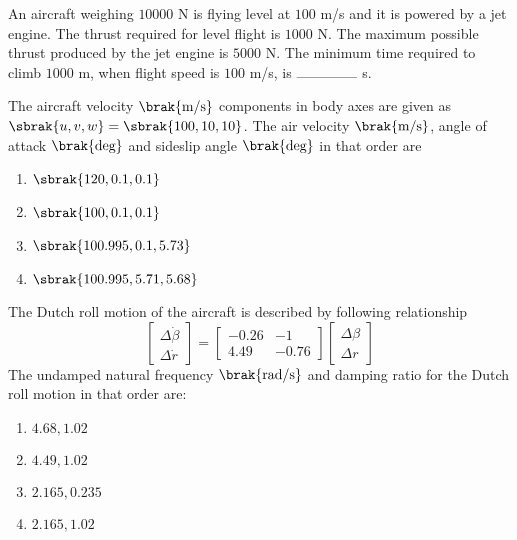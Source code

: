 	\item An aircraft weighing $10000$ N is flying level at $100$ m/s and it is powered by a jet engine. The thrust required for level flight is $1000$ N. The maximum possible thrust produced by the jet engine is $5000$ N. The minimum time required to climb $1000$ m, when flight speed is $100$ m/s, is $\rule{1.5cm}{0.4pt}$ s.\\

	\item The aircraft velocity $\brak{\text{m/s}}$ components in body axes are given as $\sbrak{u, v, w} = \sbrak{100, 10, 10}$. The air velocity $\brak{\text{m/s}}$, angle of attack $\brak{\text{deg}}$ and sideslip angle $\brak{\text{deg}}$ in that order are
		\begin{enumerate}
			\item $\sbrak{120,0.1,0.1}$
			\item $\sbrak{100,0.1,0.1}$
			\item $\sbrak{100.995,0.1,5.73}$
			\item $\sbrak{100.995,5.71,5.68}$\\
		\end{enumerate}
		
	\item The Dutch roll motion of the aircraft is described by following relationship
$$\begin{bmatrix}
\Delta \dot{\beta} \\ 
\Delta \dot{r} 
\end{bmatrix} 
= 
\begin{bmatrix} 
-0.26 & -1 \\ 
4.49 & -0.76 
\end{bmatrix}
\begin{bmatrix} 
\Delta \beta \\ 
\Delta r 
\end{bmatrix}$$
The undamped natural frequency $\brak{\text{rad/s}}$ and damping ratio for the Dutch roll motion in that order are:
               \begin{enumerate}
		       \item $4.68,1.02$
		       \item $4.49,1.02$
		       \item $2.165,0.235$
		       \item $2.165,1.02$
	       \end{enumerate}
